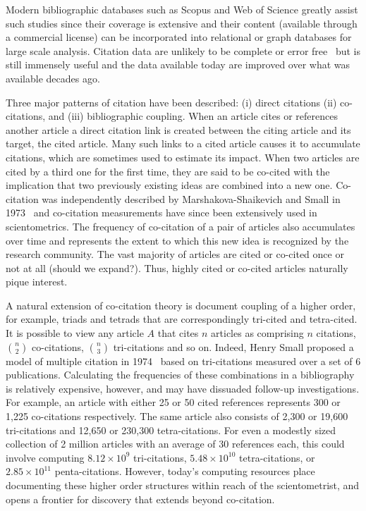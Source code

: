 \documentclass[11pt, oneside]{article}   	%
\begin{document}
Modern bibliographic databases such as Scopus and Web of Science greatly assist such studies since their coverage is extensive and their content (available through a commercial license) can be incorporated into relational or graph databases for large scale analysis. Citation data are unlikely to be complete or error free~\citep{macroberts2017} but is still immensely useful and the data available today are improved over what was available decades ago. 

Three major patterns of citation have been described: (i) direct citations (ii) co-citations, and (iii) bibliographic coupling. When an article cites or references another article a direct citation link is created between the citing article and its target, the cited article. Many such links to a cited article causes it to accumulate citations, which are sometimes used to estimate its impact. When two articles are cited by a third one for the first time, they are said to be co-cited with the implication that two previously existing ideas are combined into a new one. Co-citation was independently described by Marshakova-Shaikevich and Small in 1973~\citep{MarshakovaShaikevich1973,Small1973} and co-citation measurements have since been extensively used in scientometrics. The frequency of co-citation of a pair of articles  also accumulates over time and represents the extent to which this new idea is recognized by the research community. The vast majority of articles are cited or co-cited once or not at all (should we expand?). Thus, highly cited or co-cited articles naturally pique interest. 

A natural extension of co-citation theory is document coupling of a higher order, for example, triads and tetrads that are correspondingly tri-cited and tetra-cited. It is possible to view any article $A$ that cites $n$ articles as comprising $n$ citations, $n\choose2$ co-citations, $n\choose3$ tri-citations and so on. Indeed, Henry Small proposed a model of multiple citation in 1974~\citep{small1974multiple} based on tri-citations measured over a set of 6 publications.  Calculating the frequencies of these combinations in a bibliography is relatively expensive, however, and may have dissuaded follow-up investigations. For example, an article with either 25 or 50 cited references represents 300 or 1,225 co-citations respectively. The same article also consists of  2,300 or 19,600 tri-citations and  12,650 or  230,300 tetra-citations. For even a modestly sized collection of 2 million articles with an average of 30 references each, this could involve computing $8.12\times10^9$ tri-citations, $5.48\times10^{10}$ tetra-citations, or $2.85\times10^{11}$ penta-citations. However, today's computing resources place documenting these higher order structures within reach of the scientometrist, and opens a frontier for discovery that extends beyond co-citation.
\end{document}
